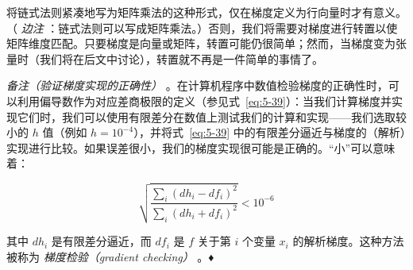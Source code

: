 将链式法则紧凑地写为矩阵乘法的这种形式，仅在梯度定义为行向量时才有意义。（ \emph{边注} ：链式法则可以写成矩阵乘法。）否则，我们将需要对梯度进行转置以使矩阵维度匹配。只要梯度是向量或矩阵，转置可能仍很简单；然而，当梯度变为张量时（我们将在后文中讨论），转置就不再是一件简单的事情了。

\emph{备注（验证梯度实现的正确性）} 。在计算机程序中数值检验梯度的正确性时，可以利用偏导数作为对应差商极限的定义（参见式~\eqref{eq:5-39}）：当我们计算梯度并实现它们时，我们可以使用有限差分在数值上测试我们的计算和实现——我们选取较小的 $ h $ 值（例如 $ h = 10^{-4} $），并将式~\eqref{eq:5-39} 中的有限差分逼近与梯度的（解析）实现进行比较。如果误差很小，我们的梯度实现很可能是正确的。“小”可以意味着：

\begin{equation*}
\sqrt{\frac{\sum_i (dh_i - df_i)^2}{\sum_i (dh_i + df_i)^2}} < 10^{-6}
\end{equation*}

其中 $ dh_i $ 是有限差分逼近，而 $ df_i $ 是 $ f $ 关于第 $ i $ 个变量 $ x_i $ 的解析梯度。这种方法被称为 \emph{梯度检验（gradient checking）} 。♦
